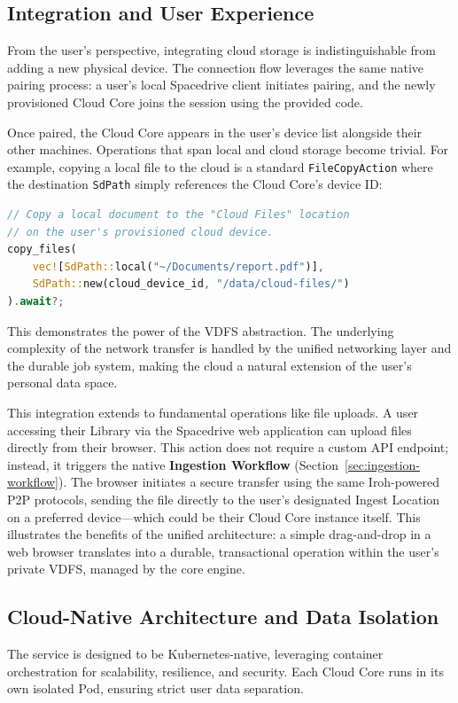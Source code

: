\documentclass[sigconf]{acmart}
\begin{document}
\subsection{Integration and User Experience}
From the user's perspective, integrating cloud storage is indistinguishable from adding a new physical device. The connection flow leverages the same native pairing process: a user's local Spacedrive client initiates pairing, and the newly provisioned Cloud Core joins the session using the provided code.

Once paired, the Cloud Core appears in the user's device list alongside their other machines. Operations that span local and cloud storage become trivial. For example, copying a local file to the cloud is a standard \texttt{FileCopyAction} where the destination \texttt{SdPath} simply references the Cloud Core's device ID:

\begin{lstlisting}[language=Rust, caption={A cross-device copy to the cloud uses the same native operation}]
// Copy a local document to the "Cloud Files" location
// on the user's provisioned cloud device.
copy_files(
    vec![SdPath::local("~/Documents/report.pdf")],
    SdPath::new(cloud_device_id, "/data/cloud-files/")
).await?;
\end{lstlisting}

This demonstrates the power of the VDFS abstraction. The underlying complexity of the network transfer is handled by the unified networking layer and the durable job system, making the cloud a natural extension of the user's personal data space.

This integration extends to fundamental operations like file uploads. A user accessing their Library via the Spacedrive web application can upload files directly from their browser. This action does not require a custom API endpoint; instead, it triggers the native \textbf{Ingestion Workflow} (Section~\ref{sec:ingestion-workflow}). The browser initiates a secure transfer using the same Iroh-powered P2P protocols, sending the file directly to the user's designated Ingest Location on a preferred device—which could be their Cloud Core instance itself. This illustrates the benefits of the unified architecture: a simple drag-and-drop in a web browser translates into a durable, transactional operation within the user's private VDFS, managed by the core engine.

\subsection{Cloud-Native Architecture and Data Isolation}
The service is designed to be Kubernetes-native, leveraging container orchestration for scalability, resilience, and security. Each Cloud Core runs in its own isolated Pod, ensuring strict user data separation.
\end{document}

